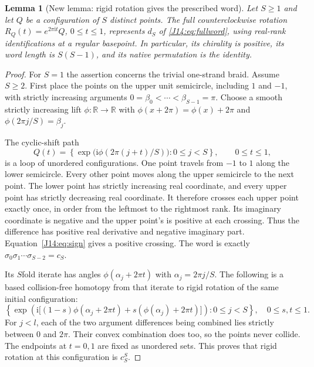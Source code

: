 \documentclass[11pt,oneside]{report}
\newtheorem{lemma}[theorem]{Lemma}
\theoremstyle{definition}
\numberwithin{equation}{section}
\newcommand{\ii}{\mathrm i}
\begin{document}
\begin{lemma}[New lemma: rigid rotation gives the prescribed word]
\label{J14:lem:rotation}
Let $S\geq1$ and let $Q$ be a configuration of $S$ distinct points.
The full counterclockwise rotation
$R_Q(t)=e^{2\pi\ii t}Q$, $0\leq t\leq1$, represents $d_S$ of
\eqref{J14:eq:fullword}, using real-rank identifications at a regular basepoint.
In particular, its chirality is positive, its word length is $S(S-1)$,
and its native permutation is the identity.
\end{lemma}
\begin{proof}
For $S=1$ the assertion concerns the trivial one-strand braid. Assume $S\geq2$.
First place the points on the upper unit semicircle, including $1$ and $-1$,
with strictly increasing arguments
$0=\beta_0<\cdots<\beta_{S-1}=\pi$.
Choose a smooth strictly increasing lift $\phi:\mathbb R\to\mathbb R$
with $\phi(x+2\pi)=\phi(x)+2\pi$ and
$\phi(2\pi j/S)=\beta_j$.

The cyclic-shift path
\[
 Q(t)=\left\{\exp\bigl(\ii\phi(2\pi(j+t)/S)\bigr):0\leq j<S\right\},
 \qquad 0\leq t\leq1,
\]
is a loop of unordered configurations. One point travels from $-1$ to $1$
along the lower semicircle. Every other point moves along the upper
semicircle to the next point. The lower point has strictly increasing real
coordinate, and every upper point has strictly decreasing real coordinate.
It therefore crosses each upper point exactly once, in order from the
leftmost to the rightmost rank. Its imaginary coordinate is negative and
the upper point's is positive at each crossing. Thus the difference has
positive real derivative and negative imaginary part. Equation~\eqref{J14:eq:sign}
gives a positive crossing. The word is exactly
$\sigma_0\sigma_1\cdots\sigma_{S-2}=c_S$.

Its $S$fold iterate has angles $\phi(\alpha_j+2\pi t)$ with
$\alpha_j=2\pi j/S$. The following is a based collision-free homotopy from
that iterate to rigid rotation of the same initial configuration:
\begin{equation}\label{J14:eq:rotatehomotopy}
 \left\{
 \exp\left(\ii\bigl[(1-s)\phi(\alpha_j+2\pi t)
       +s(\phi(\alpha_j)+2\pi t)\bigr]\right):0\leq j<S
 \right\},\quad 0\leq s,t\leq1.
\end{equation}
For $j<l$, each of the two argument differences being combined lies
strictly between $0$ and $2\pi$. Their convex combination does too, so the
points never collide. The endpoints at $t=0,1$ are fixed as unordered sets.
This proves that rigid rotation at this configuration is $c_S^S$.


\end{proof}
\end{document}
